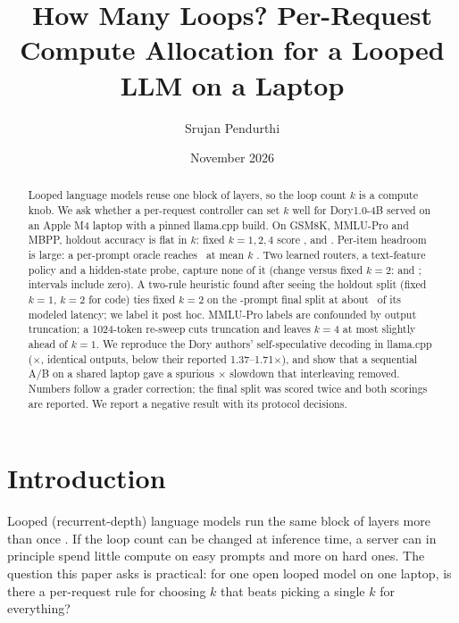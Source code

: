 \documentclass[11pt]{article}
\title{How Many Loops? Per-Request Compute Allocation for a Looped LLM on a Laptop}
\author{Srujan Pendurthi}
\date{November 2026}
\makeatletter
\def\sg@aux#1#2\relax{\if#1-$-$#2\else\if#1+{+}#2\else{+}#1#2\fi\fi}
\newcommand{\sg}[1]{\expandafter\sg@aux#1\relax}
\newcommand{\DorySpecLo}{1.37}%
\newcommand{\DorySpecHi}{1.71}%
\makeatother
\begin{document}
\maketitle

\begin{abstract}
Looped language models reuse one block of layers, so the loop count $k$ is a compute knob. We ask whether a per-request controller can set $k$ well for Dory1.0-4B served on an Apple M4 laptop with a pinned llama.cpp build. On GSM8K, MMLU-Pro and MBPP, holdout accuracy is flat in $k$: fixed $k{=}1,2,4$ score \HoldoutFixedOneAcc, \HoldoutFixedTwoAcc{} and \HoldoutFixedFourAcc. Per-item headroom is large: a per-prompt oracle reaches \HoldoutOracleAcc\ at mean $k$ \HoldoutOracleMeanK. Two learned routers, a text-feature policy and a hidden-state probe, capture none of it (change versus fixed $k{=}2$: \sg{\HoldoutTextDelta} and \sg{\HoldoutProbeDelta}; intervals include zero). A two-rule heuristic found after seeing the holdout split (fixed $k{=}1$, $k{=}2$ for code) ties fixed $k{=}2$ on the \FinalN-prompt final split at about \FloorLatencyRatio\ of its modeled latency; we label it post hoc. MMLU-Pro labels are confounded by output truncation; a 1024-token re-sweep cuts truncation and leaves $k{=}4$ at most slightly ahead of $k{=}1$. We reproduce the Dory authors' self-speculative decoding in llama.cpp (\SpecNFourSpeedup$\times$, identical outputs, below their reported \DorySpecLo--\DorySpecHi$\times$), and show that a sequential A/B on a shared laptop gave a spurious \SpecSequentialRatio$\times$ slowdown that interleaving removed. Numbers follow a grader correction; the final split was scored twice and both scorings are reported. We report a negative result with its protocol decisions.
\end{abstract}

\section{Introduction}
Looped (recurrent-depth) language models run the same block of layers more than once \citep{huginn2025,ouro2025,dory2026}. If the loop count can be changed at inference time, a server can in principle spend little compute on easy prompts and more on hard ones. The question this paper asks is practical: for one open looped model on one laptop, is there a per-request rule for choosing $k$ that beats picking a single $k$ for everything?
\end{document}

